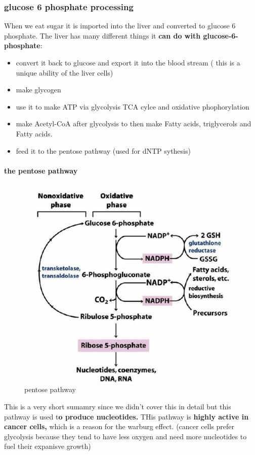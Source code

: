 \documentclass[../main.tex]{subfiles}
\begin{document}
\subsubsection{glucose 6 phosphate processing}
When we eat sugar it is imported into the liver and converted to glucose 6 phosphate. The liver has many different things it \textbf{can do with glucose-6-phosphate}:
\begin{itemize}
    \item convert it back to glucose and export it into the blood stream ( this is a unique ability of the liver cells)
    \item make glycogen
    \item use it to make ATP via glycolysis TCA cylce and oxidative phophorylation
    \item make Acetyl-CoA after glycolysis to then make Fatty acids, triglycerols and Fatty acids.
    \item feed it to the pentose pathway (used for dNTP sythesis)
\end{itemize}
\paragraph{the pentose pathway}
\begin{figure}[H]
    \centering
    \includegraphics[width=0.5\linewidth]{Sum_BC_II//lectures//bcll12/PPP.png}
    \caption{pentose pathway}
    \label{fig:enter-label}
\end{figure}
This is a very short sumamry since we didn't cover this in detail but this pathway is used t\textbf{o produce nucleotides.} THis pathway is\textbf{ highly active in cancer cells,} which is a reason for the warburg effect. (cancer cells prefer glycolysis because they tend to have less oxygen and need more nucleotides to fuel their expanisve growth)
\end{document}
